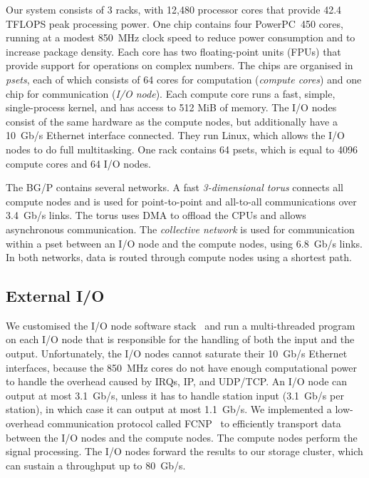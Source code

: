 \documentclass{llncs}
\begin{document}
Our system consists of 3 racks, with 12,480 processor cores that provide 42.4 TFLOPS peak processing power. One chip contains four PowerPC~450 cores, running at a modest 850~MHz clock speed to reduce power consumption and to increase package density. Each core has two floating-point units (FPUs) that provide support for operations on complex numbers. The chips are organised in \emph{psets}, each of which consists of 64 cores for computation (\emph{compute cores}) and one chip for communication (\emph{I/O node}). Each compute core runs a fast, simple, single-process kernel,  and has access to 512 MiB of memory. The I/O nodes consist of the same hardware as the compute nodes, but additionally have a 10~Gb/s Ethernet interface connected. They run Linux, which allows the I/O nodes to do full multitasking. One rack contains 64 psets, which is equal to 4096 compute cores and 64 I/O nodes.

The BG/P contains several networks. A fast \emph{3-dimensional torus\/} connects all compute nodes and is used for point-to-point and all-to-all communications over 3.4~Gb/s links. The torus uses DMA to offload the CPUs and allows asynchronous communication. The \emph{collective network\/} is used for communication within a pset between an I/O node and the compute nodes, using 6.8~Gb/s links. In both networks, data is routed through compute nodes using a shortest path.%

\subsection{External I/O}
\label{Sec:Networks}

We customised the I/O node software stack~\cite{Yoshii:10} and run a multi-threaded program on each I/O node that is responsible for the handling of both the input and the output. Unfortunately, the I/O nodes cannot saturate their 10~Gb/s Ethernet interfaces, because the 850~MHz cores do not have enough computational power to handle the overhead caused by IRQs, IP, and UDP/TCP. An I/O node can output at most 3.1~Gb/s, unless it has to handle station input (3.1~Gb/s per station), in which case it can output at most 1.1~Gb/s. We implemented a low-overhead communication protocol called FCNP~\cite{Romein:09a} to efficiently transport data between the I/O nodes and the compute nodes. The compute nodes perform the signal processing. The I/O nodes forward the results to our storage cluster, which can sustain a throughput up to 80~Gb/s.
\end{document}
